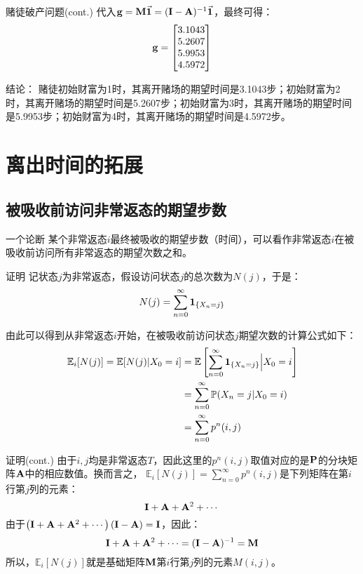 \documentclass[t]{beamer}
\renewcommand{\Pr}{\mathbb{P}}
\newcommand{\E}{\mathbb{E}}
\begin{document}
\begin{frame}{赌徒破产问题(cont.)}
    代入${\bf g}={\bf M}\vec{\bf 1}=({\bf I}-{\bf A})^{-1}\vec{\bf 1}$，最终可得：
    \[{\bf g}=\begin{bmatrix}
        3.1043\\
        5.2607\\
        5.9953\\
        4.5972
    \end{bmatrix} \]

    \begin{block}{结论：}
        赌徒初始财富为1时，其离开赌场的期望时间是3.1043步；初始财富为2时，其离开赌场的期望时间是5.2607步；初始财富为3时，其离开赌场的期望时间是5.9953步；初始财富为4时，其离开赌场的期望时间是4.5972步。    
    \end{block}

\end{frame}


\section{离出时间的拓展}
\subsection{被吸收前访问非常返态的期望步数}
\begin{frame}{一个论断}
    某个非常返态$i$最终被吸收的期望步数（时间），可以看作非常返态$i$在被吸收前访问所有非常返态的期望次数之和。
\end{frame}

\begin{frame}{证明}
    记状态$j$为非常返态，假设访问状态$j$的总次数为$N(j)$，于是：
\[N(j)=\sum_{n=0}^{\infty}{\bf 1}_{\{X_n=j\}} \]

由此可以得到从非常返态$i$开始，在被吸收前访问状态$j$期望次数的计算公式如下：
\[\begin{split}
\E_i[N(j)]=\E[N(j)|X_0=i]&=\E\left[\sum_{n=0}^{\infty}{\bf 1}_{\{X_n=j\}} \Big|X_0=i \right]\\ 
&=\sum_{n=0}^{\infty}\Pr(X_n=j|X_0=i)\\
&=\sum_{n=0}^{\infty}p^n(i,j)
\end{split} \]
\end{frame}


\begin{frame}{证明(cont.)}
    由于$i,j$均是非常返态$T$，因此这里的$p^n(i,j)$取值对应的是${\bf P}$的分块矩阵${\bf A}$中的相应数值。换而言之，
$\E_i[N(j)]=\sum_{n=0}^{\infty}p^n(i,j)$是下列矩阵在第$i$行第$j$列的元素：
\[{\bf I}+{\bf A}+{\bf A}^2+\cdots \]
由于$\left({\bf I}+{\bf A}+{\bf A}^2+\cdots \right)({\bf I}-{\bf A})={\bf I} $，因此：
\begin{equation*}
    {\bf I}+{\bf A}+{\bf A}^2+\cdots =({\bf I}-{\bf A})^{-1}={\bf M}
\end{equation*}
所以，$\E_i[N(j)]$就是基础矩阵${\bf M}$第$i$行第$j$列的元素$M(i,j)$。
\end{frame}
\end{document}
